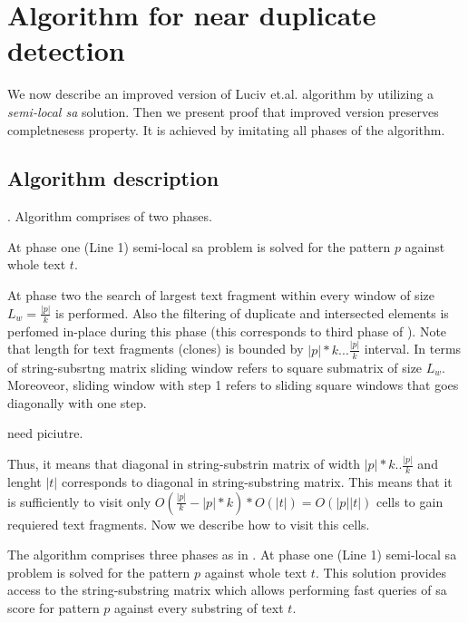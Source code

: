 \section{Algorithm for near duplicate detection}
\label{section:luciv}

We now describe an improved version of Luciv et.al. algorithm \cite{luciv2019interactive} by utilizing a \emph{semi-local sa} solution.
Then we present proof that improved version preserves completnesess property.
It is achieved by imitating all phases of the algorithm. 
 

\subsection{Algorithm description}

.
Algorithm comprises of two phases.

At phase one (Line 1) semi-local sa problem is solved for the pattern $p$ against whole text $t$.

At phase two the search of largest text fragment within every window of size $L_{w} =\frac{|p|}{k}$ is performed.
Also the filtering of duplicate and intersected elements is perfomed in-place during this phase (this corresponds to third phase of \cite{luciv2019interactive}).
Note that length for text fragments (clones) is bounded by $|p|*k...\frac{|p|}{k}$ interval.
In terms of string-subsrtng matrix sliding window refers to square submatrix of size $L_{w}$.
Moreoveor, sliding window with step 1 refers to sliding square windows that goes diagonally with one step.

need piciutre.

Thus, it means that diagonal in string-substrin matrix of width $|p|*k..\frac{|p|}{k}$ and lenght $|t|$ corresponds to diagonal in string-substring matrix.
This means that it is sufficiently to visit only $O(\frac{|p|}{k} - |p|*k) * O(|t|) = O(|p||t|)$  cells to gain requiered text fragments.
Now we describe how to visit this cells.





The algorithm comprises three phases as in \cite{luciv2019interactive}.
At phase one (Line 1) semi-local sa problem is solved for the pattern $p$ against whole text $t$.
This solution provides access to the string-substring matrix which allows performing fast queries of sa score for pattern $p$ against every substring of text $t$.

